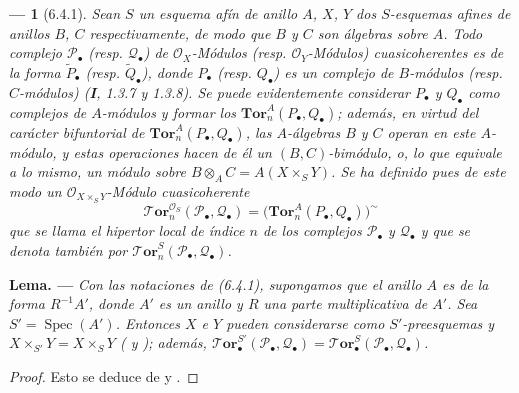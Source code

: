 \documentclass[10pt,oneside,openany]{book}
\makeatletter
\theoremstyle{egaenv}\newtheorem*{env}{---}
\theoremstyle{egastatement}
\theoremstyle{egadescription}
\newenvironment{namedtheorem}[2][]{\par\medskip\noindent\setmanualcurrentlabel{#1}\textbf{#2\ifstrempty{#1}{}{ (#1)}. ---}\ifstrequal{#2}{Observación}{\normalfont}{\ifstrequal{#2}{Observaciones}{\normalfont}{\itshape}}}{\par\medskip}
\newcommand{\setmanualcurrentlabel}[1]{\def\@currentlabel{#1}}
\makeatother
\begin{document}
\begin{env}[6.4.1]
Sean $S$ un esquema afín de anillo $A$, $X$, $Y$ dos $S$-esquemas afines
de anillos $B$, $C$ respectivamente, de modo que $B$ y $C$ son álgebras
sobre $A$. Todo complejo $\mathscr P_\bullet$ (resp. $\mathscr Q_\bullet$) de
$\mathscr O_X$-Módulos (resp. $\mathscr O_Y$-Módulos) cuasicoherentes es de
la forma $\widetilde{P}_\bullet$ (resp. $\widetilde{Q}_\bullet$), donde
$P_\bullet$ (resp. $Q_\bullet$) es un complejo de $B$-módulos (resp.
$C$-módulos) (\textbf{I}, 1.3.7 y 1.3.8). Se puede evidentemente considerar $P_\bullet$
y $Q_\bullet$ como complejos de $A$-módulos y formar los
$\mathbf{Tor}_n^A(P_\bullet,Q_\bullet)$; además, en virtud del carácter
bifuntorial de $\mathbf{Tor}_n^A(P_\bullet,Q_\bullet)$, las $A$-álgebras
$B$ y $C$ operan en este $A$-módulo, y estas operaciones hacen de él un
$(B,C)$-bimódulo, o, lo que equivale a lo mismo, un módulo sobre
$B\otimes_A C=A(X\times_S Y)$. Se ha definido pues de este modo un
$\mathscr O_{X\times_S Y}$-Módulo cuasicoherente
\[
  \boldsymbol{\mathscr{T}\!or}_n^{\mathscr O_S}(\mathscr P_\bullet,\mathscr Q_\bullet)
  =\bigl(\mathbf{Tor}_n^A(P_\bullet,Q_\bullet)\bigr)^{\sim}
  \tag{6.4.1.1}\label{III.6.4.1.1.fr}
\]
que se llama el \emph{hipertor local} de índice $n$ de los complejos
$\mathscr P_\bullet$ y $\mathscr Q_\bullet$ y que se denota también por
$\boldsymbol{\mathscr{T}\!or}_n^S(\mathscr P_\bullet,\mathscr Q_\bullet)$.
\end{env}

\begin{namedtheorem}[6.4.2]{Lema}
Con las notaciones de \textup{(6.4.1)}, supongamos que el anillo $A$ es de la forma
$R^{-1}A'$, donde $A'$ es un anillo y $R$ una parte
multiplicativa de $A'$. Sea $S'=\operatorname{Spec}(A')$. Entonces $X$ e $Y$
pueden considerarse como $S'$-preesquemas y
$X\times_{S'}Y=X\times_S Y$
\textup{(} y \textup{)}; además,
$\boldsymbol{\mathscr{T}\!or}_\bullet^{S'}(\mathscr P_\bullet,\mathscr Q_\bullet)
=\boldsymbol{\mathscr{T}\!or}_\bullet^S(\mathscr P_\bullet,\mathscr Q_\bullet)$.
\end{namedtheorem}

\begin{proof}
Esto se deduce de  y .
\end{proof}
\end{document}

